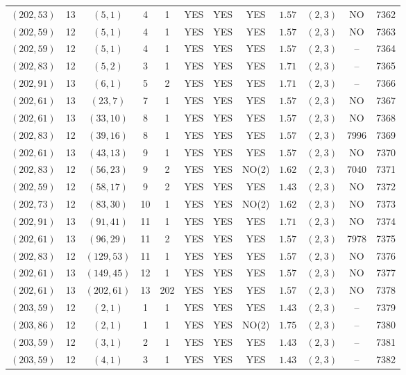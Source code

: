 \begin{longtable}{|c|c|c|c|c|c|c|c|c|c|c|c|}
$(202,53)$ & 13 & $(5,1)$ & 4 & 1 & YES & YES & YES & $1.57$ & $(2,3)$ & NO & 7362\\
$(202,59)$ & 12 & $(5,1)$ & 4 & 1 & YES & YES & YES & $1.57$ & $(2,3)$ & NO & 7363\\
$(202,59)$ & 12 & $(5,1)$ & 4 & 1 & YES & YES & YES & $1.57$ & $(2,3)$ & -- & 7364\\
$(202,83)$ & 12 & $(5,2)$ & 3 & 1 & YES & YES & YES & $1.71$ & $(2,3)$ & -- & 7365\\
$(202,91)$ & 13 & $(6,1)$ & 5 & 2 & YES & YES & YES & $1.71$ & $(2,3)$ & -- & 7366\\
$(202,61)$ & 13 & $(23,7)$ & 7 & 1 & YES & YES & YES & $1.57$ & $(2,3)$ & NO & 7367\\
$(202,61)$ & 13 & $(33,10)$ & 8 & 1 & YES & YES & YES & $1.57$ & $(2,3)$ & NO & 7368\\
$(202,83)$ & 12 & $(39,16)$ & 8 & 1 & YES & YES & YES & $1.57$ & $(2,3)$ & 7996 & 7369\\
$(202,61)$ & 13 & $(43,13)$ & 9 & 1 & YES & YES & YES & $1.57$ & $(2,3)$ & NO & 7370\\
$(202,83)$ & 12 & $(56,23)$ & 9 & 2 & YES & YES & NO(2) & $1.62$ & $(2,3)$ & 7040 & 7371\\
$(202,59)$ & 12 & $(58,17)$ & 9 & 2 & YES & YES & YES & $1.43$ & $(2,3)$ & NO & 7372\\
$(202,73)$ & 12 & $(83,30)$ & 10 & 1 & YES & YES & NO(2) & $1.62$ & $(2,3)$ & NO & 7373\\
$(202,91)$ & 13 & $(91,41)$ & 11 & 1 & YES & YES & YES & $1.71$ & $(2,3)$ & NO & 7374\\
$(202,61)$ & 13 & $(96,29)$ & 11 & 2 & YES & YES & YES & $1.57$ & $(2,3)$ & 7978 & 7375\\
$(202,83)$ & 12 & $(129,53)$ & 11 & 1 & YES & YES & YES & $1.57$ & $(2,3)$ & NO & 7376\\
$(202,61)$ & 13 & $(149,45)$ & 12 & 1 & YES & YES & YES & $1.57$ & $(2,3)$ & NO & 7377\\
$(202,61)$ & 13 & $(202,61)$ & 13 & 202 & YES & YES & YES & $1.57$ & $(2,3)$ & NO & 7378\\
$(203,59)$ & 12 & $(2,1)$ & 1 & 1 & YES & YES & YES & $1.43$ & $(2,3)$ & -- & 7379\\
$(203,86)$ & 12 & $(2,1)$ & 1 & 1 & YES & YES & NO(2) & $1.75$ & $(2,3)$ & -- & 7380\\
$(203,59)$ & 12 & $(3,1)$ & 2 & 1 & YES & YES & YES & $1.43$ & $(2,3)$ & -- & 7381\\
$(203,59)$ & 12 & $(4,1)$ & 3 & 1 & YES & YES & YES & $1.43$ & $(2,3)$ & -- & 7382\\

\end{longtable}

